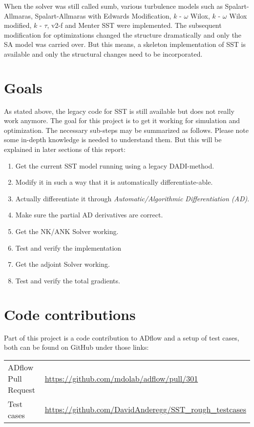 When the solver was still called sumb, various turbulence models such as
Spalart-Allmaras, Spalart-Allmaras with Edwards Modification, $k$ - $\omega$
Wilox, $k$ - $\omega$ Wilox modified, $k$ - $\tau$, v2-f and Menter SST were
implemented. The subsequent modification for optimizations changed the
structure dramatically and only the SA model was carried over. But this means,
a skeleton implementation of SST is available and only the structural changes
need to be incorporated.


\section{Goals}
As stated above, the legacy code for SST is still available but does not really
work anymore. The goal for this project is to get it working for simulation and
optimization. The necessary sub-steps may be summarized as follows. Please note
some in-depth knowledge is needed to understand them. But this will be
explained in later sections of this report:

\begin{enumerate}
    \item Get the current SST model running using a legacy DADI-method.

    \item Modify it in such a way that it is automatically differentiate-able.

    \item Actually differentiate it through \textit{Automatic/Algorithmic
        Differentiation (AD)}.

    \item Make sure the partial AD derivatives are correct. 

    \item Get the NK/ANK Solver working.

    \item Test and verify the implementation

    \item Get the adjoint Solver working.

    \item Test and verify the total gradients.
\end{enumerate}








\section{Code contributions}
Part of this project is a code contribution to ADflow and a setup of test
cases, both can be found on GitHub under those links:\\

\begin{tabular}{l l}
    ADflow Pull Request &
    \url{https://github.com/mdolab/adflow/pull/301}\footnotemark \\

    Test cases & \url{https://github.com/DavidAnderegg/SST_rough_testcases}
\end{tabular}


